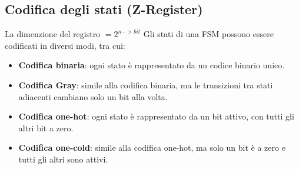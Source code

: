     \subsection{Codifica degli stati (Z-Register)}
    La dimenzione del registro $ = 2^{n->bit}$
    Gli stati di una FSM possono essere codificati in diversi modi, tra cui:
    \begin{itemize}
        \item \textbf{Codifica binaria}: ogni stato è rappresentato da un codice binario unico.
        \item \textbf{Codifica Gray}: simile alla codifica binaria, ma le transizioni tra stati adiacenti cambiano solo un bit alla volta.
        \item \textbf{Codifica one-hot}: ogni stato è rappresentato da un bit attivo, con tutti gli altri bit a zero.
        \item \textbf{Codifica one-cold}: simile alla codifica one-hot, ma solo un bit è a zero e tutti gli altri sono attivi.
    \end{itemize}